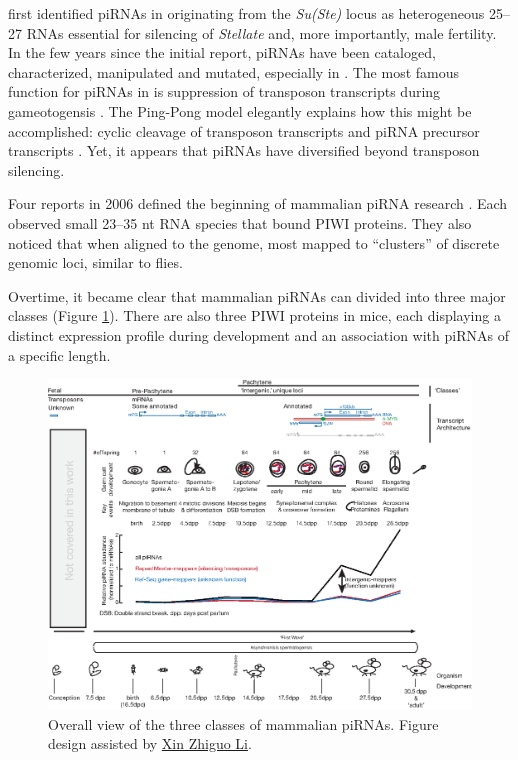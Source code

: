     \citet{Aravin2001} first identified piRNAs in \flies{} originating from the \textit{Su(Ste)} locus as heterogeneous 25--27 RNAs essential for silencing of \textit{Stellate} and, more importantly, male fertility. In the few years since the initial report, piRNAs have been cataloged, characterized, manipulated and mutated, especially in \flies{} \citep{Siomi2011,Luteijn2013,Hirose2014}. The most famous function for piRNAs in \flies{} is suppression of transposon transcripts during gameotogensis \citep{Malone2009}. The Ping-Pong model elegantly explains how this might be accomplished: cyclic cleavage of transposon transcripts and piRNA precursor transcripts \citep{Brennecke2007,Gunawardane2007}. Yet, it appears that piRNAs have diversified beyond transposon silencing.

    Four reports in 2006 defined the beginning of mammalian piRNA research \citep{Aravin2006,Grivna2006,Girard2006,Lau2006}. Each observed small 23--35 nt RNA species that bound PIWI proteins. They also noticed that when aligned to the genome, most mapped to ``clusters'' of discrete genomic loci, similar to flies.

    Overtime, it became clear that mammalian piRNAs can divided into three major classes (Figure \ref{Intro:fig:Mammalian piRNA classes}). There are also three PIWI proteins in mice, each displaying a distinct expression profile during development and an association with piRNAs of a specific length.

    \begin{landscape}
      \begin{figure} %
        \centering 
        \includegraphics{Figures/Intro/MammalianPiRNAClassesOverTime.eps}
        \caption[Different Classes of mammalian piRNAs]
        {
          Overall view of the three classes of mammalian piRNAs. Figure design assisted by \href{mailto:xin.li@umassmed.edu}{Xin Zhiguo Li}.
          } \label{Intro:fig:Mammalian piRNA classes}
        \end{figure}
      \end{landscape}

